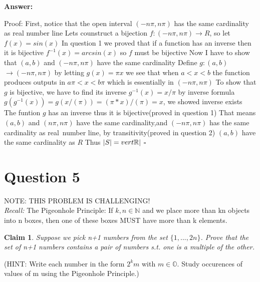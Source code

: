 \documentclass[12pt]{article}
\newtheorem*{claim}{Claim}
\begin{document}
{\noindent\bf Answer:}
{
Proof: First, notice that the open interval $(-n\pi,n\pi)$ has the same cardinality as real number line\newline
Lets counstruct a bijection $f:(-n\pi,n\pi) \rightarrow R$, so let $f(x)=sin(x)$\newline
In question 1 we proved that if a function has an inverse then it is bijective\newline
$f^{-1}(x)=arcsin(x)$ so $f$ must be bijective\newline
Now I have to show that $(a,b)$ and  $(-n\pi,n\pi)$ have the same cardinality\newline
Define $g:(a,b)$$\rightarrow (-n \pi,n\pi)$ by letting $g(x)=\pi x$ we see that when $a<x<b$ the function produces outputs in $a\pi<x<b\pi$ which is essentially in  $(-n\pi,n\pi)$ \newline
To show that $g$ is bijective, we have to find its inverse\newline
$g^{-1}(x)=x/\pi$ by inverse formula\newline
$g(g^{-1}(x))=g(x/(\pi))=(\pi*x)/(\pi)=x$, we showed inverse exists\newline
The funtion $g$ has an inverse thus it is bijective(proved in question 1)\newline
That means $(a,b)$ and  $(n\pi,n\pi)$ have the same cardinality,and  $(-n\pi,n\pi)$ has the same cardinality as real\
 number line, by transitivity(proved in question 2) $(a,b)$ have the same cardinality as $R$\newline
Thus $\vert S\vert=\\vert\mathbb{R}\vert$ $\square$

}


\newpage
\section*{Question 5}

NOTE: THIS PROBLEM IS CHALLENGING!\\

{\noindent\it Recall:} The Pigeonhole Principle: If $k,n\in\mathbb{N}$ and we place more than
kn objects into n boxes, then one of these boxes MUST have more than k elements.

\begin{claim}
Suppose we pick n+1 numbers from the set $\{1,...,2n\}$. Prove that the set of n+1 numbers contains a pair of numbers s.t. one is a multiple of the other.
\end{claim}
\noindent (HINT: Write each number in the form $2^{k}m$ with $m\in\mathbb{O}$. Study occurences of values of m using the Pigeonhole Principle.)\\
\end{document}
